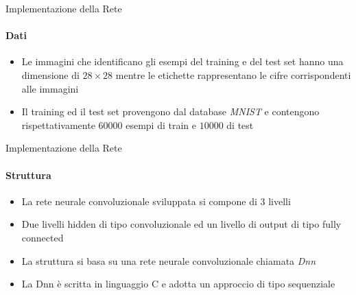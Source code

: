 \documentclass[
 ]{beamer}
\begin{document}
\begin{frame}{Implementazione della Rete}
    \framesubtitle{Dati}
    \begin{itemize} [<+->]
        \setlength\itemsep{3em}
        \item \large Le immagini che identificano gli esempi del training e del test set hanno una dimensione di $28 \times 28$ mentre le etichette rappresentano le cifre corrispondenti alle immagini
        \item \large Il training ed il test set provengono dal database \emph{MNIST} e contengono rispettativamente $60000$ esempi di train e $10000$ di test 
    \end{itemize}
\end{frame}


\begin{frame}{Implementazione della Rete}
    \framesubtitle{Struttura}
    \begin{itemize} [<+->]
        \setlength\itemsep{2.5em}
        \item \large La rete neurale convoluzionale sviluppata si compone di 3 livelli
        \item \large Due livelli hidden di tipo convoluzionale ed un livello di output di tipo fully connected
        \item \large La struttura si basa su una rete neurale convoluzionale chiamata \emph{Dnn} 
        \item \large La Dnn è scritta in linguaggio C e adotta un approccio di tipo sequenziale
    \end{itemize}
\end{frame}
\end{document}
